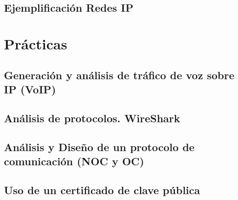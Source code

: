 \documentclass[a4paper]{book}
\numberwithin{figure}{chapter}
\numberwithin{equation}{subsection}
\begin{document}
\section{Ejemplificación Redes IP}





\chapter{Prácticas}

\section{Generación y análisis de tráfico de voz sobre IP (VoIP)}

\section{Análisis de protocolos. WireShark}

\section{ Análisis y Diseño de un protocolo de comunicación (NOC y OC)}

\section{Uso de un certificado de clave pública}



%
% 
\end{document}
